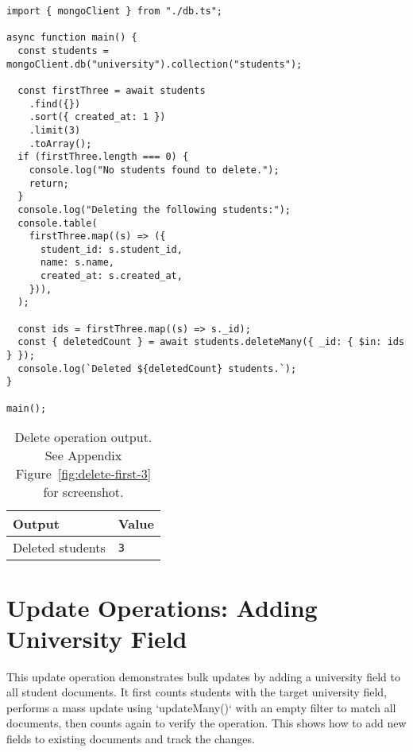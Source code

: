 \begin{verbatim}
import { mongoClient } from "./db.ts";

async function main() {
  const students = mongoClient.db("university").collection("students");

  const firstThree = await students
    .find({})
    .sort({ created_at: 1 })
    .limit(3)
    .toArray();
  if (firstThree.length === 0) {
    console.log("No students found to delete.");
    return;
  }
  console.log("Deleting the following students:");
  console.table(
    firstThree.map((s) => ({
      student_id: s.student_id,
      name: s.name,
      created_at: s.created_at,
    })),
  );

  const ids = firstThree.map((s) => s._id);
  const { deletedCount } = await students.deleteMany({ _id: { $in: ids } });
  console.log(`Deleted ${deletedCount} students.`);
}

main();
\end{verbatim}

\begin{table}[H]
  \centering
  \begin{tabular}{|l|l|}
    \hline
    \textbf{Output} & \textbf{Value} \\
    \hline
    Deleted students & \texttt{3} \\
    \hline
  \end{tabular}
  \caption{Delete operation output. See Appendix Figure~\ref{fig:delete-first-3} for screenshot.}
\end{table}

\section{Update Operations: Adding University Field}
This update operation demonstrates bulk updates by adding a university field to all student documents. It first counts students with the target university field, performs a mass update using `updateMany()` with an empty filter to match all documents, then counts again to verify the operation. This shows how to add new fields to existing documents and track the changes.

